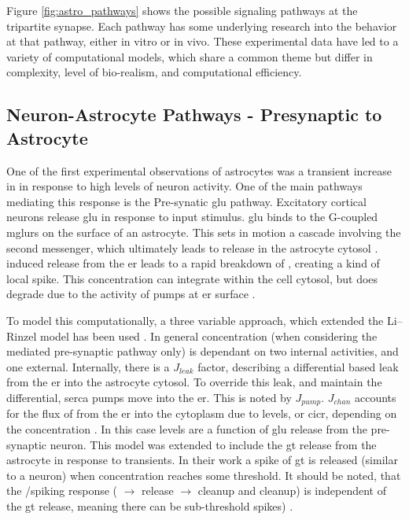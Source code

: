     Figure \ref{fig:astro_pathways} shows the possible signaling pathways at the
    tripartite synapse. Each pathway has some underlying research into the
    behavior at that pathway, either in vitro or in vivo. These experimental data
    have led to a variety of computational models, which share a common theme but
    differ in complexity, level of bio-realism, and computational efficiency.

    \subsection{Neuron-Astrocyte Pathways - Presynaptic to Astrocyte}

    One of the first experimental observations of astrocytes was a transient
    increase in \ca in response to high levels of neuron activity. One of the
    main pathways mediating this response is the Pre-synatic \gls{glu}
    pathway. Excitatory cortical neurons release \gls{glu} in response to input
    stimulus. \Gls{glu} binds to the G-coupled \glspl{mglur} on the surface
    of an astrocyte. This sets in motion a cascade involving the \ipt second
    messenger, which ultimately leads to \ca release in the astrocyte cytosol
    \parencite{pitta_2012}. \ipt induced \ca release from the \gls{er} leads to a rapid
    breakdown of \ipt, creating a kind of local \ca spike. This \ca
    concentration can integrate within the cell cytosol, but does degrade due to
    the activity of pumps at \gls{er} surface \parencite{pitta_2012}.

    To model this computationally, a three variable approach, which extended the
    Li–Rinzel model \parencite{li_1994} has been used \parencite{pitta_2009}. In
    general \ca concentration (when considering the \ipt mediated pre-synaptic
    pathway only) is dependant on two internal activities, and one
    external. Internally, there is a $J_{leak}$ factor, describing a
    differential based leak from the \gls{er} into the astrocyte cytosol. To
    override this leak, and maintain the differential, \gls{serca} pumps move
    \ca into the \gls{er}. This is noted by $J_{pump}$. $J_{chan}$ accounts for
    the flux of \ca from the \gls{er} into the cytoplasm due to \ipt levels, or
    \gls{cicr}, depending on the \ca concentration \parencite{pitta_2009}. In
    this case \ipt levels are a function of \gls{glu} release from the
    pre-synaptic neuron. This model was extended to include the \gls{gt} release
    from the astrocyte in response to \ca transients. In their work a spike of
    \gls{gt} is released (similar to a neuron) when \ca concentration reaches
    some threshold. It should be noted, that the \ipt/\ca spiking response (\ipt
    $\rightarrow$ \ca release $\rightarrow$ \ipt cleanup and \ca cleanup) is
    independent of the \gls{gt} release, meaning there can be sub-threshold \ca
    spikes) \parencite{pitta_2016}.

